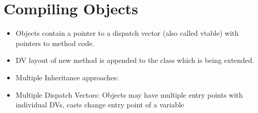 \section*{Compiling Objects}
\begin{itemize}
	\item Objects contain a pointer to a dispatch vector (also called vtable) with pointers to method code. 
	
	\item DV layout of new method is appended to the class which is being extended.
	
	\item Multiple Inheritance approaches: 
	
	\item Multiple Dispatch Vectors: Objects may have multiple entry points with individual DVs, casts change entry point of a variable
\end{itemize}
